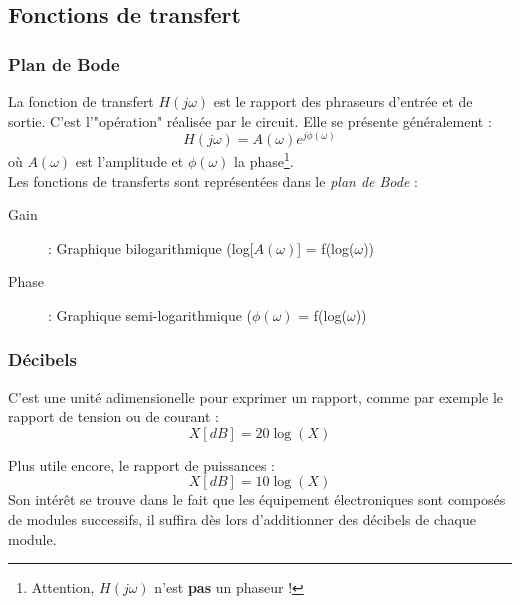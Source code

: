 \subsection{Fonctions de transfert}
\subsubsection{Plan de Bode}
La fonction de transfert $H(j\omega)$ est le rapport des phraseurs d'entrée et de sortie. C'est l'"opération" réalisée par le circuit. Elle se présente généralement :
\begin{equation}
	H(j\omega) = A(\omega)e^{j\phi(\omega)}
\end{equation}
où $A(\omega)$ est l'amplitude et $\phi(\omega)$ la phase\footnote{Attention, $H(j\omega)$ n'est \textbf{pas} un phaseur !}.\\

Les fonctions de transferts sont représentées dans le \textit{plan de Bode} :
\begin{description}
	\item[Gain] : Graphique bilogarithmique (log[$A(\omega)$] = f(log($\omega$))
	\item[Phase]: Graphique semi-logarithmique ($\phi(\omega)$ = f(log($\omega$))
\end{description}

\subsubsection{Décibels}
C'est une unité adimensionelle pour exprimer un rapport, comme par exemple le rapport de tension ou de courant :
\begin{equation}
	X[dB] = 20\log(X)
\end{equation}

Plus utile encore, le rapport de puissances :
\begin{equation}
	X[dB] = 10\log(X)
\end{equation}
Son intérêt se trouve dans le fait que les équipement électroniques sont composés de modules successifs, il suffira dès lors d'additionner des décibels de chaque module.